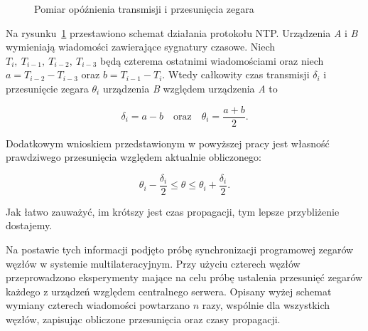 \begin{figure}[H]
    \centering
    \begin{subfigure}[b]{0.65\textwidth}
    \centering
    \end{subfigure}
    \caption{Pomiar opóźnienia transmisji i przesunięcia zegara}
    \label{fig:ntp}
\end{figure}

Na rysunku~\ref{fig:ntp} przestawiono schemat działania protokołu NTP. Urządzenia \textit{A} i \textit{B} wymieniają wiadomości zawierające sygnatury czasowe. Niech $T_{i},\ T_{i-1},\ T_{i-2},\ T_{i-3}$ będą czterema ostatnimi wiadomościami oraz niech $a = T_{i-2} - T_{i-3}$ oraz $b = T_{i-1} - T_i$. Wtedy całkowity czas transmisji $\delta_i$ i przesunięcie zegara $\theta_i$ urządzenia \textit{B} względem urządzenia \textit{A} to

\[\delta_i = a - b\quad \text{oraz}\quad \theta_i = \frac{a+b}{2}.\]

Dodatkowym wnioskiem przedstawionym w powyższej pracy jest własność prawdziwego przesunięcia względem aktualnie obliczonego:

\[\theta_i - \frac{\delta_i}{2} \leqslant \theta \leqslant \theta_i + \frac{\delta_i}{2}.\]

Jak łatwo zauważyć, im krótszy jest czas propagacji, tym lepsze przybliżenie dostajemy.

Na postawie tych informacji podjęto próbę synchronizacji programowej zegarów węzłów w systemie multilateracyjnym. Przy użyciu czterech węzłów przeprowadzono eksperymenty mające na celu próbę ustalenia przesunięć zegarów każdego z urządzeń względem centralnego serwera. Opisany wyżej schemat wymiany czterech wiadomości powtarzano $n$ razy, wspólnie dla wszystkich węzłów, zapisując obliczone przesunięcia oraz czasy propagacji.


